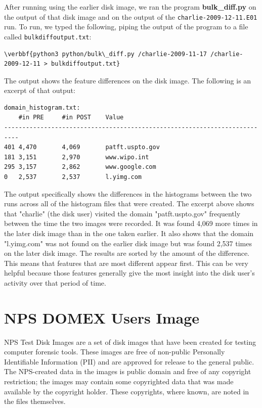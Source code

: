 After running \bulk using the earlier disk image, we ran the program \textbf{bulk\_diff.py} on the output of that disk image and on the output of the \texttt{charlie-2009-12-11.E01} run. To run, we typed the following, piping the output of the program to a file called \texttt{bulkdiffoutput.txt}:
\begin{Verbatim}[commandchars=\\\{\}]
\verbbf{python3 python/bulk\_diff.py /charlie-2009-11-17 /charlie-2009-12-11 > bulkdiffoutput.txt}
\end{Verbatim}
The output shows the feature differences on the disk image. The following is an excerpt of that output:
\lstset{style=customfile}
\begin{lstlisting}
domain_histogram.txt:
	#in PRE		#in POST	Value
--------------------------------------------------------------------------
401	4,470		4,069		patft.uspto.gov
181	3,151		2,970		www.wipo.int
295	3,157		2,862		www.google.com
0	2,537		2,537		l.yimg.com
\end{lstlisting}
The output specifically shows the differences in the histograms between the two runs across all of the histogram files that were created. The excerpt above shows that "charlie" (the disk user) visited the domain "patft.uspto.gov" frequently between the time the two images were recorded. It was found 4,069 more times in the later disk image than in the one taken earlier. It also shows that the domain "l.yimg.com" was not found on the earlier disk image but was found 2,537 times on the later disk image. The results are sorted by the amount of the difference. This means that features that are most different appear first. This can be very helpful because those features generally give the most insight into the disk user's activity over that period of time.

\section{NPS DOMEX Users Image}
NPS Test Disk Images are a set of disk images that have been created for testing computer forensic tools. These images are free of non-public Personally Identifiable Information (PII) and are approved for release to the general public. The NPS-created data in the images is public domain and free of any copyright restriction; the images may contain some copyrighted data that was made available by the copyright holder. These copyrights, where known, are noted in the files themselves\cite{npsdiskimages}. \\

